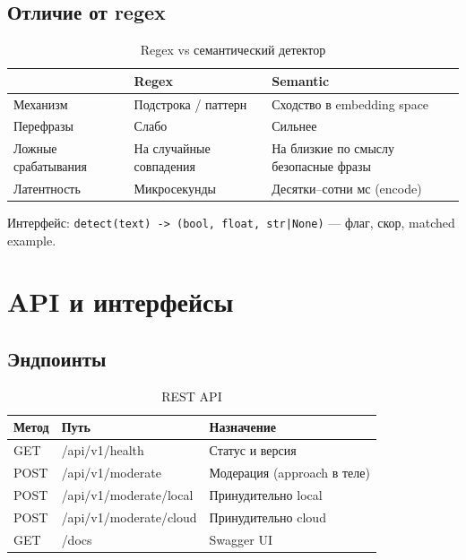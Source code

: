\documentclass[12pt,a4paper]{report}
\begin{document}
\section{Отличие от regex}

\begin{table}[H]
\centering
\caption{Regex vs семантический детектор}
\begin{tabular}{@{}lll@{}}
\toprule
 & \textbf{Regex} & \textbf{Semantic} \\
\midrule
Механизм & Подстрока / паттерн & Сходство в embedding space \\
Перефразы & Слабо & Сильнее \\
Ложные срабатывания & На случайные совпадения & На близкие по смыслу безопасные фразы \\
Латентность & Микросекунды & Десятки--сотни мс (encode) \\
\bottomrule
\end{tabular}
\end{table}

Интерфейс: \texttt{detect(text) -> (bool, float, str|None)} --- флаг, скор, matched example.

\chapter{API и интерфейсы}

\section{Эндпоинты}

\begin{table}[H]
\centering
\caption{REST API}
\begin{tabular}{@{}llp{6.5cm}@{}}
\toprule
\textbf{Метод} & \textbf{Путь} & \textbf{Назначение} \\
\midrule
GET & /api/v1/health & Статус и версия \\
POST & /api/v1/moderate & Модерация (approach в теле) \\
POST & /api/v1/moderate/local & Принудительно local \\
POST & /api/v1/moderate/cloud & Принудительно cloud \\
GET & /docs & Swagger UI \\
\bottomrule
\end{tabular}
\end{table}
\end{document}
